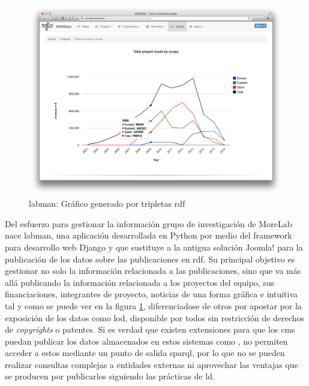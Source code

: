 \begin{figure}[!htp]
	\centering
	\includegraphics[scale=0.21]{fig/labman-chart}
	\caption{\acrshort{labman}: Gráfico generado por tripletas \acrshort{rdf}}\label{fig:labmanchart}
\end{figure}

Del esfuerzo para gestionar la información grupo de investigación de MoreLab nace \acrshort{labman}, una aplicación desarrollada en Python\cite{Python} por medio del framework para desarrollo web Django\cite{Django} y que sustituye a la antigua solución Joomla! para la publicación de los datos sobre las publicaciones en \acrfull{rdf}\cite{RDF}. Su principal objetivo es gestionar no solo la información relacionada a las publicaciones, sino que va más allá publicando la información relacionada a los proyectos del equipo, sus financiaciones, integrantes de proyecto, noticias de una forma gráfica e intuitiva tal y como se puede ver en la figura \ref{fig:labmanchart}, diferenciadose de otros  por apostar por la exposición de los datos como \acrlong{lod}\cite{linkeddata}, disponible por todos sin restricción de derechos de \textit{copyrights} o patentes. Si es verdad que existen extensiones para que los \acrshort{cms} puedan publicar los datos almacenados en estos sistemas como , no permiten acceder a estos mediante un punto de salida \acrshort{sparql}, por lo que no se pueden realizar consultas complejas a entidades externas ni aprovechar las ventajas que se producen por publicarlos siguiendo las prácticas de \acrshort{ld}.\cite{pena_visual_2014}